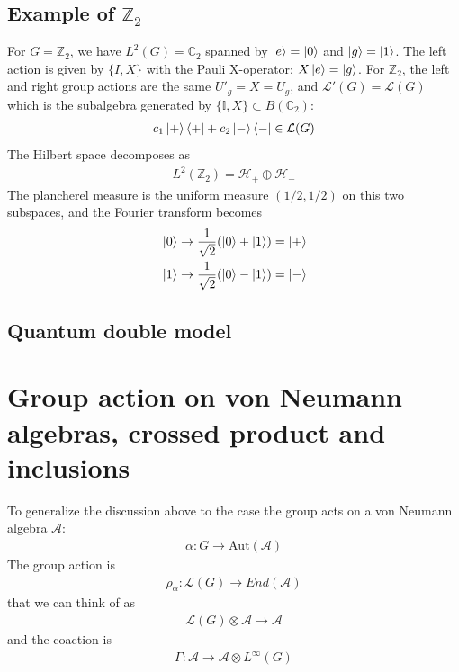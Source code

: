 \documentclass{article}
\newcommand{\mA}{\mathcal{A}}
\newcommand{\nn}{\nonumber}
\theoremstyle{definition}
\begin{document}
\subsection{Example of $\mathbb{Z}_2$}

For $G=\mathbb{Z}_2$, we have $L^2(G)=\mathbb{C}_2$ spanned by $\ket{e}=\ket{0}$ and $\ket{g}=\ket{1}$. The left action is given by $\{I,X\}$ with the Pauli X-operator: $X\ket{e}=\ket{g}$. For $\mathbb{Z}_2$, the left and right group actions are the same $U'_g=X=U_g$, and $\mathcal{L}'(G)=\mathcal{L}(G)$ which is the subalgebra generated by $\{\mathbb{I},X\}\subset B(\mathbb{C}_2)$:
\begin{align}
    c_1 \ket{+}\bra{+}+c_2\ket{-}\bra{-}\in \mathcal{L}(G)
\end{align}
The Hilbert space decomposes as
\begin{align}
    L^2(\mathbb{Z}_2)=\mathcal{H}_+\oplus \mathcal{H}_-
\end{align}
The plancherel measure is the uniform measure $(1/2,1/2)$ on this two subspaces, and the Fourier transform becomes
\begin{align}
    &\ket{0}\to \frac{1}{\sqrt{2}}(\ket{0}+\ket{1})=\ket{+}\nn\\
    &\ket{1}\to \frac{1}{\sqrt{2}}(\ket{0}-\ket{1})=\ket{-}
\end{align}

\subsection{Quantum double model}

\section{Group action on von Neumann algebras, crossed product and inclusions}

To generalize the discussion above to the case the group acts on a von Neumann algebra $\mathcal{A}$:
\begin{align}
    \alpha:G\to \text{Aut}(\mA)
\end{align}
The group action is
\begin{align}
    \rho_\alpha:\mathcal{L}(G)\to End(\mA)
\end{align}
that we can think of as
\begin{align}
    \mathcal{L}(G)\otimes \mA\to \mA
\end{align}
and the coaction is
\begin{align}
    \Gamma:\mA\to \mA\otimes L^\infty(G)
\end{align}
\end{document}
